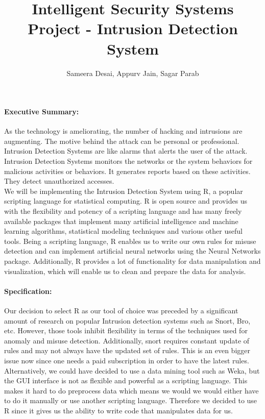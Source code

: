\documentclass{article}
\title{Intelligent Security Systems\\Project - Intrusion Detection System}
\author{Sameera Desai, Appurv Jain, Sagar Parab}
\begin{document}
\maketitle
\paragraph{Executive Summary:\\}
As the technology is ameliorating, the number of hacking and intrusions are augmenting. The motive behind the attack can be personal or professional. Intrusion Detection Systems are like alarms that alerts the user of the attack. Intrusion Detection Systems monitors the networks or the system behaviors for malicious activities or behaviors. It generates reports based on these activities. They detect unauthorized accesses.\\

We will be implementing the Intrusion Detection System using R, a popular scripting language for statistical computing. R is open source and provides us with the flexibility and potency of a scripting language and has many freely available packages that implement many artificial intelligence and machine learning algorithms, statistical modeling techniques and various other useful tools. Being a scripting language, R enables us to write our own rules for misuse detection and can implement artificial neural networks using the Neural Networks package. Additionally, R provides a lot of functionality for data manipulation and visualization, which will enable us to clean and prepare the data for analysis.
	
	
\paragraph{Specification:\\}
Our decision to select R as our tool of choice was preceded by a significant amount of research on popular Intrusion detection systems such as Snort, Bro, etc. However, those tools inhibit flexibility in terms of the techniques used for anomaly and misuse detection. Additionally, snort requires constant update of rules and may not always have the updated set of rules. This is an even bigger issue now since one needs a paid subscription in order to have the latest rules.\\

Alternatively, we could have decided to use a data mining tool such as Weka, but the GUI interface is not as flexible and powerful as a scripting language. This makes it hard to do preprocess data which means we would we would either have to do it manually or use another scripting language. Therefore we decided to use R since it gives us the ability to write code that manipulates data for us.\\
 
\end{document}
